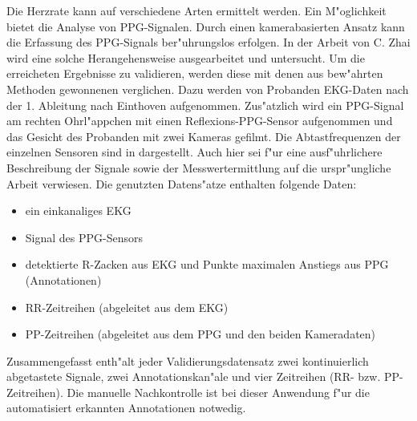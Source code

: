 Die Herzrate kann auf verschiedene Arten ermittelt werden.
Ein M"oglichkeit bietet die Analyse von \ac{PPG}-Signalen.
Durch einen kamerabasierten Ansatz kann die Erfassung des \ac{PPG}-Signals ber"uhrungslos erfolgen.
In der Arbeit von C. Zhai \cite{Zhai2012} wird eine solche Herangehensweise ausgearbeitet und untersucht.
Um die erreicheten Ergebnisse zu validieren, werden diese mit denen aus bew"ahrten Methoden gewonnenen verglichen.
Dazu werden von Probanden \ac{EKG}-Daten nach der 1. Ableitung nach Einthoven aufgenommen.
Zus"atzlich wird ein \ac{PPG}-Signal am rechten Ohrl"appchen mit einen Reflexions-\ac{PPG}-Sensor aufgenommen und das Gesicht des Probanden mit zwei Kameras gefilmt.
Die Abtastfrequenzen der einzelnen Sensoren sind in  dargestellt.
Auch hier sei f"ur eine ausf"uhrlichere Beschreibung der Signale sowie der Messwertermittlung auf die urspr"ungliche Arbeit \cite{Zhai2012} verwiesen.
Die genutzten Datens"atze enthalten folgende Daten:
\begin{itemize}
	\item ein einkanaliges \ac{EKG}
	\item Signal des \ac{PPG}-Sensors
	\item detektierte R-Zacken aus \ac{EKG} und Punkte maximalen Anstiegs aus \ac{PPG} (Annotationen)
	\item RR-Zeitreihen (abgeleitet aus dem \ac{EKG})
	\item PP-Zeitreihen (abgeleitet aus dem \ac{PPG} und den beiden Kameradaten)
\end{itemize}
Zusammengefasst enth"alt jeder Validierungsdatensatz zwei kontinuierlich abgetastete Signale, zwei Annotationskan"ale und vier Zeitreihen (RR- bzw. PP-Zeitreihen).
Die manuelle Nachkontrolle ist bei dieser Anwendung f"ur die automatisiert erkannten Annotationen notwedig.


